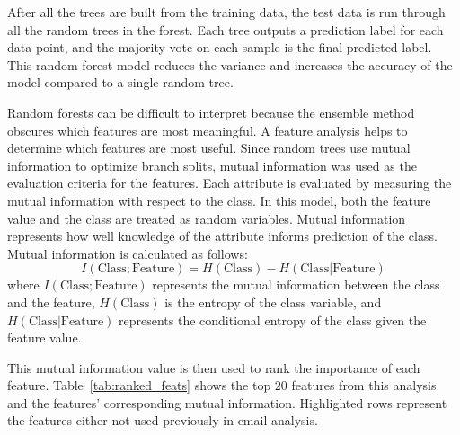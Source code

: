 \documentclass[10pt,twocolumn,conference]{IEEEtran}
\begin{document}
After all the trees are built from the training data, the test data is run through all the random trees in the forest.
Each tree outputs a prediction label for each data point, and the majority vote on each sample is the final predicted label.
This random forest model reduces the variance and increases the accuracy of the model compared to a single random tree.

Random forests can be difficult to interpret because the ensemble method obscures which features are most meaningful.
A feature analysis helps to determine which features are most useful.
Since random trees use mutual information to optimize branch splits, mutual information was used as the evaluation criteria for the features.
Each attribute is evaluated by measuring the mutual information with respect to the class.
In this model, both the feature value and the class are treated as random variables.
Mutual information represents how well knowledge of the attribute informs prediction of the class.
Mutual information is calculated as follows:
\begin{equation}
I(\text{Class}; \text{Feature}) = H(\text{Class}) - H(\text{Class} | \text{Feature})
\end{equation} \label{eq:info_gained}
\hspace{-\parindent}
where $I(\text{Class}; \text{Feature})$ represents the mutual information between the class and the feature, $H(\text{Class})$ is the entropy of the class variable, and  $H(\text{Class} | \text{Feature})$ represents the conditional entropy of the class given the feature value.  

This mutual information value is then used to rank the importance of each feature.
Table~\ref{tab:ranked_feats} shows the top $20$ features from this analysis and the features' corresponding mutual information.
Highlighted rows represent the features either not used previously in email analysis.
\end{document}
